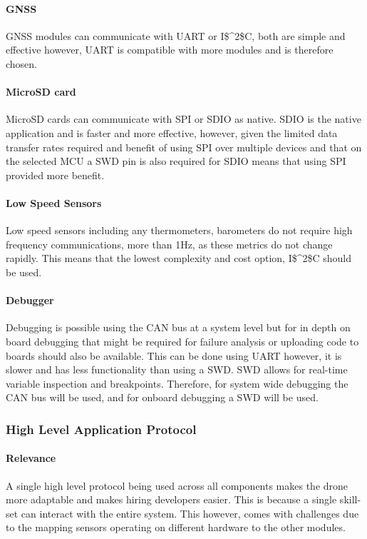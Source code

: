 \paragraph{\gls{GNSS}}
\gls{GNSS} modules can communicate with \gls{UART} or \gls{I$^2$C}, both are simple and effective however, \gls{UART} is compatible with more modules and is therefore chosen.

\paragraph{MicroSD card}
MicroSD cards can communicate with \gls{SPI} or \gls{SDIO} as native. \gls{SDIO} is the native application and is faster and more effective, however, given the limited data transfer rates required and benefit of using \gls{SPI} over multiple devices and that on the selected \gls{MCU} a \gls{SWD} pin is also required for \gls{SDIO} means that using \gls{SPI} provided more benefit.

\paragraph{Low Speed Sensors}
Low speed sensors including any thermometers, barometers do not require high frequency 
communications, more than 1Hz, as these metrics do not change rapidly. This means that the lowest complexity and cost option, \gls{I$^2$C} should be used.

\paragraph{Debugger}
Debugging is possible using the \gls{CAN} bus at a system level but for in depth on board debugging that might be required for failure analysis or uploading code to boards should also be available. This can be done using \gls{UART} however, it is slower and has less functionality than using a \gls{SWD}. \gls{SWD} allows for real-time variable inspection and breakpoints. Therefore, for system wide debugging the \gls{CAN} bus will be used, and for onboard debugging a \gls{SWD} will be used.




\subsubsection{High Level Application Protocol}
\paragraph{Relevance}
A single high level protocol being used across all components makes the drone more adaptable and makes hiring developers easier. This is because a single skill-set can interact with the entire system. This however, comes with challenges due to the mapping sensors operating on different hardware to the other modules.

